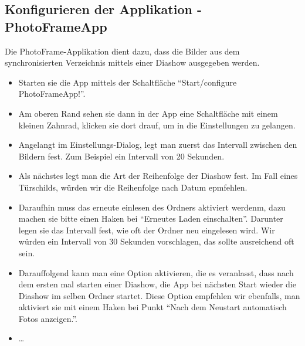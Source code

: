 \begin{flushleft}
  \subsection{Konfigurieren der Applikation - PhotoFrameApp}
  	Die PhotoFrame-Applikation dient dazu, dass die Bilder aus dem synchronisierten Verzeichnis mittels einer Diashow ausgegeben werden.
    \begin{itemize}
      \item Starten sie die App mittels der Schaltfläche ``Start/configure PhotoFrameApp!''.
      \item Am oberen Rand sehen sie dann in der App eine Schaltfläche mit einem kleinen Zahnrad, klicken sie dort drauf, um in die Einstellungen zu gelangen.
      \item Angelangt im Einstellungs-Dialog, legt man zuerst das Intervall zwischen den Bildern fest. Zum Beispiel ein Intervall von 20 Sekunden.
      \item Als nächstes legt man die Art der Reihenfolge der Diashow fest. Im Fall eines Türschilds, würden wir die Reihenfolge nach Datum epmfehlen.
      \item Daraufhin muss das erneute einlesen des Ordners aktiviert werdenm, dazu machen sie bitte einen Haken bei ``Erneutes Laden einschalten''. Darunter legen sie das Intervall fest, wie oft der Ordner neu eingelesen wird. Wir würden ein Intervall von 30 Sekunden vorschlagen, das sollte ausreichend oft sein.
      \item Darauffolgend kann man eine Option aktivieren, die es veranlasst, dass nach dem ersten mal starten einer Diashow, die App bei nächsten Start wieder die Diashow im selben Ordner startet. Diese Option empfehlen wir ebenfalls, man aktiviert sie mit einem Haken bei Punkt ``Nach dem Neustart automatisch Fotos anzeigen.''.
      \item \dots
    \end{itemize}

\end{flushleft}
